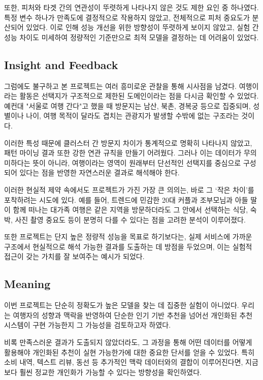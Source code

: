 \documentclass[sigconf]{acmart}
\begin{document}
\begin{CJK}{UTF8}{mj}
또한, 피처와 타겟 간의 연관성이 뚜렷하게 나타나지 않은 것도 제한 요인 중 하나였다. 특정 변수 하나가 만족도에 결정적으로 작용하지 않았고, 전체적으로 피처 중요도가 분산되어 있었다. 이로 인해 성능 개선을 위한 방향성이 뚜렷하게 보이지 않았고, 실험 간 성능 차이도 미세하여 정량적인 기준만으로 최적 모델을 결정하는 데 어려움이 있었다.

\subsection{Insight and Feedback}
그럼에도 불구하고 본 프로젝트는 여러 흥미로운 관찰을 통해 시사점을 남겼다. 여행이라는 활동은 선택지가 구조적으로 제한된 도메인이라는 점을 다시금 확인할 수 있었다. 예컨대 "서울로 여행 간다"고 했을 때 방문지는 남산, 북촌, 경복궁 등으로 집중되며, 성별이나 나이, 여행 목적이 달라도 겹치는 관광지가 발생할 수밖에 없는 구조라는 것이다.

이러한 특성 때문에 클러스터 간 방문지 차이가 통계적으로 명확히 나타나지 않았고, 패턴 마이닝 결과 또한 강한 연관 규칙을 만들기 어려웠다. 그러나 이는 데이터가 무의미하다는 뜻이 아니라, 여행이라는 영역이 원래부터 단선적인 선택지를 중심으로 구성되어 있다는 점을 반영한 자연스러운 결과로 해석해야 한다.

이러한 현실적 제약 속에서도 프로젝트가 가진 가장 큰 의의는, 바로 그 ‘작은 차이’를 포착하려는 시도에 있다. 예를 들어, 트렌드에 민감한 20대 커플과 조부모님과 아들 딸이 함께 떠나는 대가족 여행은 같은 지역을 방문하더라도 그 안에서 선택하는 식당, 숙박, 사진 촬영 중요도 등이 분명히 다를 수 있다는 점을 고려한 분석이 이루어졌다.

또한 프로젝트는 단지 높은 정량적 성능을 목표로 하기보다는, 실제 서비스에 가까운 구조에서 현실적으로 해석 가능한 결과를 도출하는 데 방점을 두었으며, 이는 실험적 접근이 갖는 가치를 잘 보여주는 예시가 되었다.

\subsection{Meaning}
이번 프로젝트는 단순히 정확도가 높은 모델을 찾는 데 집중한 실험이 아니었다. 우리는 여행자의 성향과 맥락을 반영하여 단순한 인기 기반 추천을 넘어선 개인화된 추천 시스템이 구현 가능한지 그 가능성을 검토하고자 하였다.

비록 만족스러운 결과가 도출되지 않았더라도, 그 과정을 통해 어떤 데이터를 어떻게 활용해야 개인화된 추천이 실현 가능한가에 대한 중요한 단서를 얻을 수 있었다. 특히 소비 내역, 텍스트 리뷰, 동선 등 추가적인 맥락 데이터와의 결합이 이루어진다면, 지금보다 훨씬 정교한 개인화가 가능할 수 있다는 방향성을 확인하였다.


\end{CJK}
\end{document}
